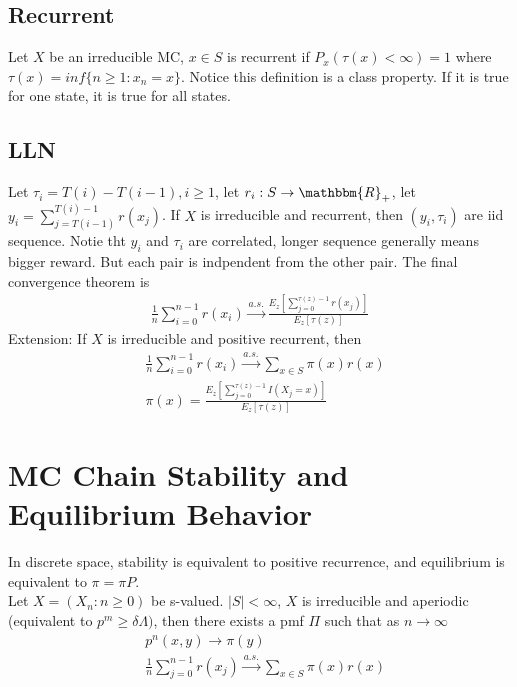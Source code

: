 \subsection{Recurrent}
Let $X$ be an irreducible MC, $x\in S$ is recurrent if $P_x(\tau(x) < \infty) = 1$ where $\tau(x) = inf\{ n\geq 1: x_n = x \}$.  Notice this definition is a class property. If it is true for one state, it is true for all states. 

\subsection{LLN}
Let $\tau_i = T(i) - T(i-1), i \geq 1$, let $r_i: S \to \mathbbm{R}_+$, let $y_i = \sum_{j=T(i-1)}^{T(i)-1} r(x_j)$. If $X$ is irreducible and recurrent, then $(y_i, \tau_i)$ are iid sequence. Notie tht $y_i$ and $\tau_i$ are correlated, longer sequence generally means bigger reward. But each pair is indpendent from the other pair. The final convergence theorem is 
    \begin{align*}
        \frac{1}{n} \sum_{i=0}^{n-1} r(x_i) \overset{a.s.}{\to} \frac{E_z\left[\sum_{j=0}^{\tau(z)-1}r(x_j) \right] }{E_z\left[ \tau(z)\right]}
    \end{align*}
Extension: If $X$ is irreducible and positive recurrent, then 
    \begin{align*}
    & \frac{1}{n} \sum_{i=0}^{n-1} r(x_i) \overset{a.s.}{\to} \sum_{x\in S}\pi(x)r(x) \\
    & \pi(x) = \frac{E_z\left[\sum_{j=0}^{\tau(z)-1} I(X_j = x) \right]}{E_z[\tau(z)]}
    \end{align*}
    
\section{MC Chain Stability and Equilibrium Behavior} 
In discrete space, stability is equivalent to positive recurrence, and equilibrium is equivalent to $\pi = \pi P$. \\

Let $X= (X_n: n \geq 0)$ be s-valued. $|S|<\infty$, $X$ is irreducible and aperiodic (equivalent to $p^m \geq \delta \Lambda)$, then there exists a pmf $\Pi$ such that as $n\to\infty$
    \begin{align*}
        & p^n(x,y)\to \pi(y) \\
        & \frac{1}{n}\sum_{j=0}^{n-1}r(x_j) \overset{a.s.}{\to} \sum_{x\in S}\pi(x) r(x)
    \end{align*}

